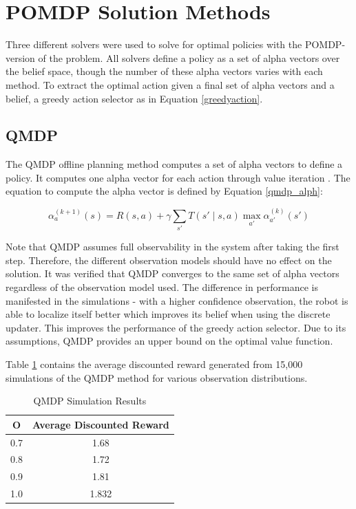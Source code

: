 \documentclass{article}
\begin{document}
\section*{POMDP Solution Methods}
Three different solvers were used to solve for optimal policies with the POMDP-version of the problem.  All solvers define a policy as a set of alpha vectors over the belief space, though the number of these alpha vectors varies with each method. To extract the optimal action given a final set of alpha vectors and a belief, a greedy action selector as in Equation \ref{greedyaction}.

\subsection*{QMDP}

The QMDP offline planning method computes a set of alpha vectors to define a policy.  It computes one alpha vector for each action through value iteration \cite[21.1]{228 Book}.  The equation to compute the alpha vector is defined by Equation \ref{qmdp_alph}:

\begin{equation}\label{qmdp_alph}
    \alpha_{a}^{(k+1)}(s) = R(s,a) + \gamma \sum_{s'}T(s' \mid s,a)\max_{a'}\alpha_{a'}^{(k)}(s')
\end{equation}

Note that QMDP assumes full observability in the system after taking the first step. Therefore, the different observation models should have no effect on the solution. It was verified that QMDP converges to the same set of alpha vectors regardless of the observation model used. The difference in performance is manifested in the simulations - with a higher confidence observation, the robot is able to localize itself better which improves its belief when using the discrete updater. This improves the performance of the greedy action selector. Due to its assumptions, QMDP provides an upper bound on the optimal value function.

Table \ref{tab:qmdp} contains the average discounted reward generated from 15,000 simulations of the QMDP method for various observation distributions.

\begin{table}[h]
\centering
\caption{QMDP Simulation Results}
\label{tab:qmdp}
\begin{tabular}{|c|c|}
\hline
O & Average Discounted Reward  \\ \hline
0.7 & 1.68 \\ \hline
0.8 & 1.72 \\ \hline
0.9 & 1.81 \\ \hline
1.0 & 1.832 \\ \hline
\end{tabular}
\end{table}
\end{document}

